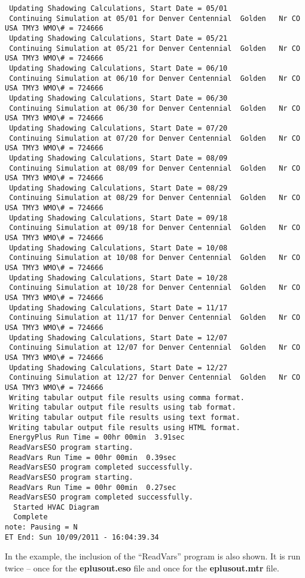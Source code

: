 \begin{lstlisting}
 Updating Shadowing Calculations, Start Date = 05/01
 Continuing Simulation at 05/01 for Denver Centennial  Golden   Nr CO USA TMY3 WMO\# = 724666
 Updating Shadowing Calculations, Start Date = 05/21
 Continuing Simulation at 05/21 for Denver Centennial  Golden   Nr CO USA TMY3 WMO\# = 724666
 Updating Shadowing Calculations, Start Date = 06/10
 Continuing Simulation at 06/10 for Denver Centennial  Golden   Nr CO USA TMY3 WMO\# = 724666
 Updating Shadowing Calculations, Start Date = 06/30
 Continuing Simulation at 06/30 for Denver Centennial  Golden   Nr CO USA TMY3 WMO\# = 724666
 Updating Shadowing Calculations, Start Date = 07/20
 Continuing Simulation at 07/20 for Denver Centennial  Golden   Nr CO USA TMY3 WMO\# = 724666
 Updating Shadowing Calculations, Start Date = 08/09
 Continuing Simulation at 08/09 for Denver Centennial  Golden   Nr CO USA TMY3 WMO\# = 724666
 Updating Shadowing Calculations, Start Date = 08/29
 Continuing Simulation at 08/29 for Denver Centennial  Golden   Nr CO USA TMY3 WMO\# = 724666
 Updating Shadowing Calculations, Start Date = 09/18
 Continuing Simulation at 09/18 for Denver Centennial  Golden   Nr CO USA TMY3 WMO\# = 724666
 Updating Shadowing Calculations, Start Date = 10/08
 Continuing Simulation at 10/08 for Denver Centennial  Golden   Nr CO USA TMY3 WMO\# = 724666
 Updating Shadowing Calculations, Start Date = 10/28
 Continuing Simulation at 10/28 for Denver Centennial  Golden   Nr CO USA TMY3 WMO\# = 724666
 Updating Shadowing Calculations, Start Date = 11/17
 Continuing Simulation at 11/17 for Denver Centennial  Golden   Nr CO USA TMY3 WMO\# = 724666
 Updating Shadowing Calculations, Start Date = 12/07
 Continuing Simulation at 12/07 for Denver Centennial  Golden   Nr CO USA TMY3 WMO\# = 724666
 Updating Shadowing Calculations, Start Date = 12/27
 Continuing Simulation at 12/27 for Denver Centennial  Golden   Nr CO USA TMY3 WMO\# = 724666
 Writing tabular output file results using comma format.
 Writing tabular output file results using tab format.
 Writing tabular output file results using text format.
 Writing tabular output file results using HTML format.
 EnergyPlus Run Time = 00hr 00min  3.91sec
 ReadVarsESO program starting.
 ReadVars Run Time = 00hr 00min  0.39sec
 ReadVarsESO program completed successfully.
 ReadVarsESO program starting.
 ReadVars Run Time = 00hr 00min  0.27sec
 ReadVarsESO program completed successfully.
  Started HVAC Diagram
  Complete
note: Pausing = N
ET End: Sun 10/09/2011 - 16:04:39.34
\end{lstlisting}

In the example, the inclusion of the ``ReadVars'' program is also shown. It is run twice -- once for the \textbf{eplusout.eso} file and once for the \textbf{eplusout.mtr} file.
